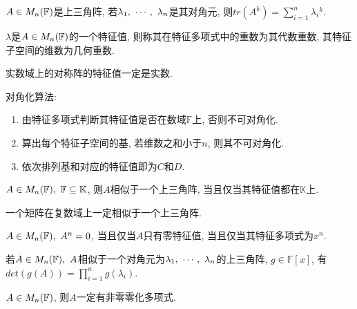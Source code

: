 \begin{inference}
    $A\in M_{n}(\mathbb{F})$是上三角阵, 若${\lambda}{_1},\ \cdots,\ {\lambda}{_{n}}$是其对角元, 则$tr(A^k)=\sum_{i=1}^n\lambda{_i}^k$.
\end{inference}

\begin{definition}[几何重数和代数重数]
    $\lambda$是$A\in M_{n}(\mathbb{F})$的一个特征值, 则称其在特征多项式中的重数为其代数重数, 其特征子空间的维数为几何重数.
\end{definition}

\begin{theorem}[实数对称阵的特征值]
    实数域上的对称阵的特征值一定是实数.
\end{theorem}

\begin{example}
    对角化算法:\par
    \begin{enumerate}[itemindent=1em]
        \item 由特征多项式判断其特征值是否在数域$\mathbb{F}$上, 否则不可对角化.
        \item 算出每个特征子空间的基, 若维数之和小于$n$, 则其不可对角化.
        \item 依次排列基和对应的特征值即为$C$和$D$.
    \end{enumerate}
\end{example}

\begin{theorem}
    $A\in M_{n}(\mathbb{F}),\ \mathbb{F}\subseteq \mathbb{K}$, 则$A$相似于一个上三角阵, 当且仅当其特征值都在$\mathbb{K}$上.
\end{theorem}

\begin{inference}
    一个矩阵在复数域上一定相似于一个上三角阵.
\end{inference}

\begin{example}
    $A\in M_{n}(\mathbb{F}),\ A^n=0$, 当且仅当$A$只有零特征值, 当且仅当其特征多项式为$x^n$.
\end{example}

\begin{example}
    若$\ainmnf{A},\ A$相似于一个对角元为${\lambda}{_1},\ \cdots,\ {\lambda}{_{n}}$的上三角阵, $g\in \mathbb{F}[x]$, 有$det(g(A))=\prod_{i=1}^n g(\lambda{_i})$.
\end{example}

\begin{statement}
    $A\in M_{n}(\mathbb{F})$, 则$A$一定有非零零化多项式.
\end{statement}


